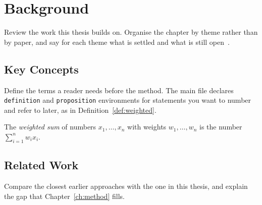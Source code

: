 \chapter{Background}
\label{ch:background}

Review the work this thesis builds on. Organise the chapter by theme
rather than by paper, and say for each theme what is settled and what is
still open~\cite{lamport1994, surname2024article}.

\section{Key Concepts}
\label{sec:concepts}

Define the terms a reader needs before the method. The main file
declares \texttt{definition} and \texttt{proposition} environments for
statements you want to number and refer to later, as in
Definition~\ref{def:weighted}.

\begin{definition}
\label{def:weighted}
The \emph{weighted sum} of numbers $x_1, \dots, x_n$ with weights
$w_1, \dots, w_n$ is the number $\sum_{i=1}^{n} w_i x_i$.
\end{definition}

\section{Related Work}
\label{sec:related}

Compare the closest earlier approaches with the one in this thesis, and
explain the gap that Chapter~\ref{ch:method} fills.
